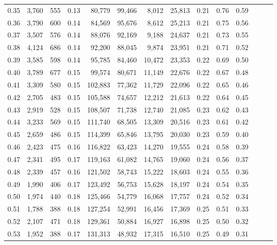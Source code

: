 \begin{tabular}{rrrrrrrrrrrrrr}
0.35 &  3,760 &  555 &  0.13 &   80,779 &   99,466 &   8,012 &  25,813 &  0.21 &  0.76 &      0.59 \\
0.36 &  3,790 &  600 &  0.14 &   84,569 &   95,676 &   8,612 &  25,213 &  0.21 &  0.75 &      0.56 \\
0.37 &  3,507 &  576 &  0.14 &   88,076 &   92,169 &   9,188 &  24,637 &  0.21 &  0.73 &      0.55 \\
0.38 &  4,124 &  686 &  0.14 &   92,200 &   88,045 &   9,874 &  23,951 &  0.21 &  0.71 &      0.52 \\
0.39 &  3,585 &  598 &  0.14 &   95,785 &   84,460 &  10,472 &  23,353 &  0.22 &  0.69 &      0.50 \\
0.40 &  3,789 &  677 &  0.15 &   99,574 &   80,671 &  11,149 &  22,676 &  0.22 &  0.67 &      0.48 \\
0.41 &  3,309 &  580 &  0.15 &  102,883 &   77,362 &  11,729 &  22,096 &  0.22 &  0.65 &      0.46 \\
0.42 &  2,705 &  483 &  0.15 &  105,588 &   74,657 &  12,212 &  21,613 &  0.22 &  0.64 &      0.45 \\
0.43 &  2,919 &  528 &  0.15 &  108,507 &   71,738 &  12,740 &  21,085 &  0.23 &  0.62 &      0.43 \\
0.44 &  3,233 &  569 &  0.15 &  111,740 &   68,505 &  13,309 &  20,516 &  0.23 &  0.61 &      0.42 \\
0.45 &  2,659 &  486 &  0.15 &  114,399 &   65,846 &  13,795 &  20,030 &  0.23 &  0.59 &      0.40 \\
0.46 &  2,423 &  475 &  0.16 &  116,822 &   63,423 &  14,270 &  19,555 &  0.24 &  0.58 &      0.39 \\
0.47 &  2,341 &  495 &  0.17 &  119,163 &   61,082 &  14,765 &  19,060 &  0.24 &  0.56 &      0.37 \\
0.48 &  2,339 &  457 &  0.16 &  121,502 &   58,743 &  15,222 &  18,603 &  0.24 &  0.55 &      0.36 \\
0.49 &  1,990 &  406 &  0.17 &  123,492 &   56,753 &  15,628 &  18,197 &  0.24 &  0.54 &      0.35 \\
0.50 &  1,974 &  440 &  0.18 &  125,466 &   54,779 &  16,068 &  17,757 &  0.24 &  0.52 &      0.34 \\
0.51 &  1,788 &  388 &  0.18 &  127,254 &   52,991 &  16,456 &  17,369 &  0.25 &  0.51 &      0.33 \\
0.52 &  2,107 &  471 &  0.18 &  129,361 &   50,884 &  16,927 &  16,898 &  0.25 &  0.50 &      0.32 \\
0.53 &  1,952 &  388 &  0.17 &  131,313 &   48,932 &  17,315 &  16,510 &  0.25 &  0.49 &      0.31 \\

\end{tabular}
